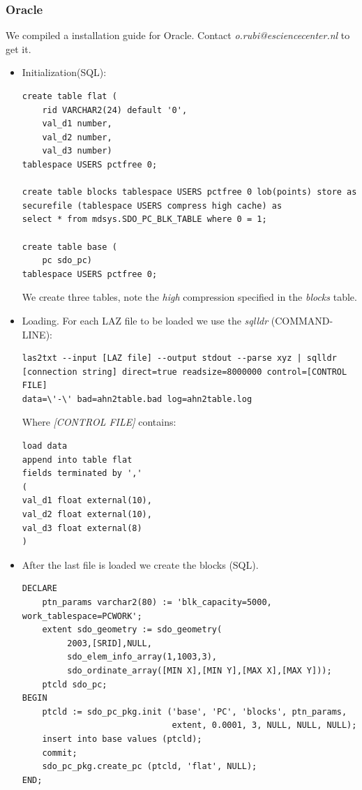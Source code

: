 \documentclass[a4paper,11pt]{article}
\begin{document}
\subsubsection{Oracle}

We compiled a installation guide for Oracle. Contact \textit{o.rubi@esciencecenter.nl} to get it.

\begin{itemize}
	\item Initialization(SQL):
\begin{verbatim}
create table flat (
    rid VARCHAR2(24) default '0',
    val_d1 number,
    val_d2 number,
    val_d3 number) 
tablespace USERS pctfree 0;
        
create table blocks tablespace USERS pctfree 0 lob(points) store as 
securefile (tablespace USERS compress high cache) as 
select * from mdsys.SDO_PC_BLK_TABLE where 0 = 1;
        
create table base (
    pc sdo_pc)
tablespace USERS pctfree 0;
\end{verbatim}

We create three tables, note the \textit{high} compression specified in the \textit{blocks} table.

	\item Loading. For each LAZ file to be loaded we use the \textit{sqlldr} (COMMAND-LINE):
\begin{verbatim}
las2txt --input [LAZ file] --output stdout --parse xyz | sqlldr 
[connection string] direct=true readsize=8000000 control=[CONTROL FILE] 
data=\'-\' bad=ahn2table.bad log=ahn2table.log
\end{verbatim}

Where \textit{[CONTROL FILE]} contains:

\begin{verbatim}
load data
append into table flat
fields terminated by ','
(
val_d1 float external(10),
val_d2 float external(10),
val_d3 float external(8)
)
\end{verbatim}

	\item After the last file is loaded we create the blocks (SQL).
	
\begin{verbatim}
DECLARE
    ptn_params varchar2(80) := 'blk_capacity=5000, work_tablespace=PCWORK';
    extent sdo_geometry := sdo_geometry(
         2003,[SRID],NULL,
         sdo_elem_info_array(1,1003,3),
         sdo_ordinate_array([MIN X],[MIN Y],[MAX X],[MAX Y]));
    ptcld sdo_pc;
BEGIN
    ptcld := sdo_pc_pkg.init ('base', 'PC', 'blocks', ptn_params, 
                              extent, 0.0001, 3, NULL, NULL, NULL);
    insert into base values (ptcld);
    commit;
    sdo_pc_pkg.create_pc (ptcld, 'flat', NULL);
END;
\end{verbatim}


\end{itemize}
\end{document}
